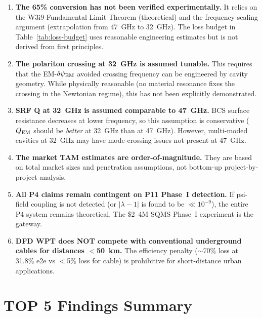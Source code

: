 \documentclass[11pt]{article}
\newcommand{\dpsiEM}{\delta\psi_{\rm EM}}
\newcommand{\lambdaone}{|\lambda{-}1|}
\newcommand{\QEM}{Q_{\rm EM}}
\begin{document}
\begin{tcolorbox}[colback=red!5!white, colframe=red!60!black,
  title=\textbf{Honest Negatives: What This Analysis Does NOT Prove}]

\begin{enumerate}
\item \textbf{The 65\% conversion has not been verified experimentally.}
  It relies on the W3i9 Fundamental Limit Theorem (theoretical) and the
  frequency-scaling argument (extrapolation from 47~GHz to 32~GHz). The
  loss budget in Table~\ref{tab:loss-budget} uses reasonable engineering
  estimates but is not derived from first principles.

\item \textbf{The polariton crossing at 32~GHz is assumed tunable.}
  This requires that the EM-$\dpsiEM$ avoided crossing frequency can be
  engineered by cavity geometry. While physically reasonable (no material
  resonance fixes the crossing in the Newtonian regime), this has not been
  explicitly demonstrated.

\item \textbf{SRF Q at 32~GHz is assumed comparable to 47~GHz.}
  BCS surface resistance decreases at lower frequency, so this assumption
  is conservative ($\QEM$ should be \emph{better} at 32~GHz than at
  47~GHz). However, multi-moded cavities at 32~GHz may have mode-crossing
  issues not present at 47~GHz.

\item \textbf{The market TAM estimates are order-of-magnitude.}
  They are based on total market sizes and penetration assumptions, not
  bottom-up project-by-project analysis.

\item \textbf{All P4 claims remain contingent on P11 Phase~I detection.}
  If psi-field coupling is not detected (or $\lambdaone$ is found to be
  $\ll 10^{-9}$), the entire P4 system remains theoretical. The \$2--4M
  SQMS Phase~I experiment is the gateway.

\item \textbf{DFD WPT does NOT compete with conventional underground
  cables for distances $<$50~km.} The efficiency penalty ($\sim$70\%
  loss at 31.8\% e2e vs $<$5\% loss for cable) is prohibitive for
  short-distance urban applications.
\end{enumerate}
\end{tcolorbox}

\section{TOP 5 Findings Summary}
\label{sec:top5}
\end{document}
